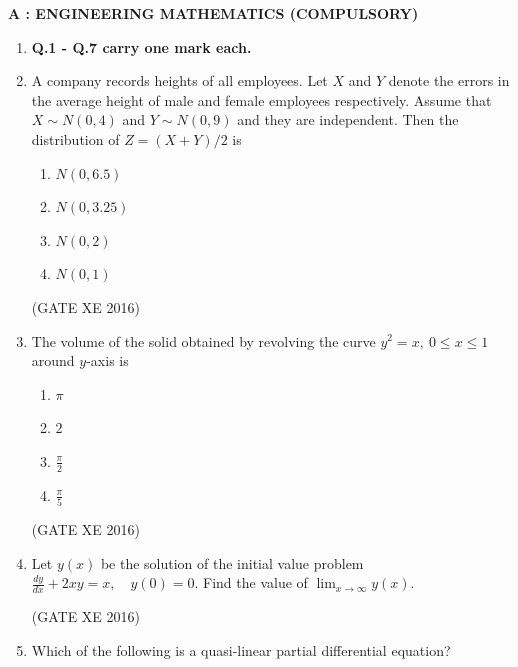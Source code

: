 \documentclass[12pt]{article}
\begin{document}
\newpage

\begin{center}
    {\Large \textbf{A : ENGINEERING MATHEMATICS (COMPULSORY)}}
\end{center}

\begin{enumerate}
\item[] \textbf{Q.1 - Q.7 carry one mark each.}

\item A company records heights of all employees. Let $X$ and $Y$ denote the errors in the average height of male and female employees respectively. Assume that $X \sim N(0,4)$ and $Y \sim N(0,9)$ and they are independent. Then the distribution of $Z = (X+Y)/2$ is  

\begin{multicols}{4}
\begin{enumerate}
    \item $N(0,6.5)$  
    \item $N(0,3.25)$  
    \item $N(0,2)$  
    \item $N(0,1)$  
\end{enumerate}
\end{multicols}

(GATE XE 2016)  

\item The volume of the solid obtained by revolving the curve $y^{2} = x,\ 0 \leq x \leq 1$ around $y$-axis is  

\begin{multicols}{4}
\begin{enumerate}
    \item $\pi$  
    \item $2$  
    \item $\tfrac{\pi}{2}$  
    \item $\tfrac{\pi}{5}$  
\end{enumerate}
\end{multicols}

(GATE XE 2016)  

\item Let $y(x)$ be the solution of the initial value problem  
$
\frac{dy}{dx} + 2xy = x, \quad y(0)=0.
$
Find the value of $\lim_{x \to \infty} y(x)$.  


(GATE XE 2016)  

\item Which of the following is a quasi-linear partial differential equation?  


\end{enumerate}
\end{document}
